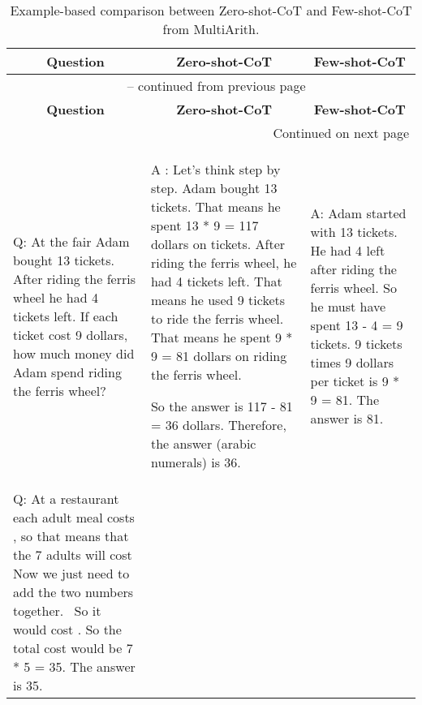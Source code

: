 \documentclass{article}
\newcommand{\ours}{Zero-shot-CoT\xspace}
\newcommand{\theirs}{Few-shot-CoT\xspace}
\newcommand{\okmark}{{\textbf{\textcolor[rgb]{0.1, 0.5, 0.1}{}}}}
\newcommand{\ngmark}{{\textbf{\color{red}{\ding{55}}}}}
\newcommand{\bred}[1]{{\textbf{\color{red}{#1}}}}
\begin{document}
\begin{center}
\begin{longtable}{|p{}|p{}|p{}|}
\caption{Example-based comparison between \ours and \theirs from MultiArith.}
\label{tab:example_multiarith_comparison}\\

\toprule \multicolumn{1}{|c|}{\textbf{Question}} & \multicolumn{1}{c|}{\textbf{\ours}} & \multicolumn{1}{c|}{\textbf{\theirs}} \\ \midrule 
\endfirsthead

\multicolumn{3}{c}{{\tablename\ \thetable{} -- continued from previous page}} \\
\toprule \multicolumn{1}{|c|}{\textbf{Question}} & \multicolumn{1}{c|}{\textbf{\ours}} & \multicolumn{1}{c|}{\textbf{\theirs}} \\ \midrule
\endhead

\multicolumn{3}{|r|}{{Continued on next page}} \\ \bottomrule
\endfoot

\bottomrule
\endlastfoot









Q: At the fair Adam bought 13 tickets. After riding the ferris wheel he had 4 tickets left. If each ticket cost 9 dollars, how much money did Adam spend riding the ferris wheel?
&A \bred{(ONE UNNECESSARY STEP ERROR)}: Let's think step by step. 
Adam bought 13 tickets. 
That means he spent 13 * 9 = 117 dollars on tickets. 
After riding the ferris wheel, he had 4 tickets left. 
That means he used 9 tickets to ride the ferris wheel. 
That means he spent 9 * 9 = 81 dollars on riding the ferris wheel. 

So the answer is 117 - 81 = 36 dollars. 
Therefore, the answer (arabic numerals) is 36. \ngmark
&A: Adam started with 13 tickets. He had 4 left after riding the ferris wheel. So he must have spent 13 - 4 = 9 tickets. 9 tickets times 9 dollars per ticket is 9 * 9 = 81. The answer is 81. \okmark \\

\midrule

Q: At a restaurant each adult meal costs \5, so that means that the 7 adults will cost \35 
Now we just need to add the two numbers together. 
\
So it would cost \5. So the total cost would be 7 * 5 = 35. The answer is 35.\okmark \\


\end{longtable}
\end{center}
\end{document}
